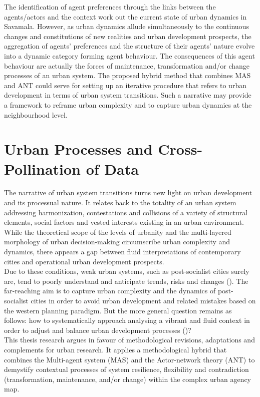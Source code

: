 \documentclass[11pt]{report}
\begin{document}
{{{{The identification of agent preferences through the links between the agents/actors and the context work out the current state of urban dynamics in Savamala. However,
as urban dynamics allude simultaneously to the continuous changes and constitutions of new realities and urban development prospects, the aggregation of agents’ preferences and the structure of their agents’ nature evolve into a dynamic category forming agent behaviour. The consequences of this agent behaviour are actually the forces of maintenance, transformation and/or change processes of an urban system. The proposed hybrid method that combines MAS and ANT could serve for setting up an iterative procedure that refers to urban development in terms of urban system transitions. Such a narrative may provide a framework to reframe urban complexity and to capture urban dynamics at the neighbourhood level.

\chapter{Urban Processes and Cross-Pollination of Data}

The narrative of urban system transitions turns new light on urban development and its processual nature. It relates back to the totality of an urban system addressing harmonization, contestations and collisions of a variety of structural elements, social factors and vested interests existing in an urban environment.
While the theoretical scope of the levels of urbanity and the multi-layered morphology of urban decision-making circumscribe urban complexity and dynamics, there appears a gap between fluid interpretations of contemporary cities and operational urban development prospects.
\\

Due to these conditions, weak urban systems, such as post-socialist cities surely are, tend to poorly understand and anticipate trends, risks and changes (\href{UN}{\citealt{un_habitat_state_2012}}). 
The far-reaching aim is to capture urban complexity and the dynamics of post-socialist cities in order to avoid urban development and related mistakes based on the western planning paradigm. But the more general question remains as follows: how to systematically approach analysing a vibrant and fluid context in order to adjust and balance urban development processes (\href{Bolay}{\citealt{bolay_technology_2011}})?
\\

This thesis research argues in favour of methodological revisions, adaptations and complements for urban research. It applies a methodological hybrid that combines the Multi-agent system (MAS) and the Actor-network theory (ANT) to demystify contextual processes of system resilience, flexibility and contradiction (transformation, maintenance, and/or change) within the complex urban agency map.
\\

}}}}
\end{document}
